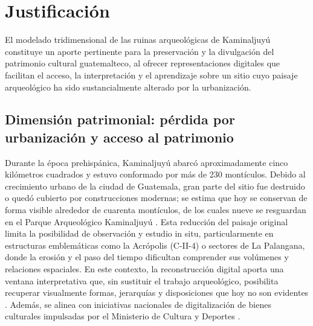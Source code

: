 
\section{Justificación}

El modelado tridimensional de las ruinas arqueológicas de Kaminaljuyú constituye un aporte pertinente para la preservación y la divulgación del patrimonio cultural guatemalteco, al ofrecer representaciones digitales que facilitan el acceso, la interpretación y el aprendizaje sobre un sitio cuyo paisaje arqueológico ha sido sustancialmente alterado por la urbanización.

\subsection*{Dimensión patrimonial: pérdida por urbanización y acceso al patrimonio}
Durante la época prehispánica, Kaminaljuyú abarcó aproximadamente cinco kilómetros cuadrados y estuvo conformado por más de 230 montículos. Debido al crecimiento urbano de la ciudad de Guatemala, gran parte del sitio fue destruido o quedó cubierto por construcciones modernas; se estima que hoy se conservan de forma visible alrededor de cuarenta montículos, de los cuales nueve se resguardan en el Parque Arqueológico Kaminaljuyú \cite{HemerotecaPL2016}. Esta reducción del paisaje original limita la posibilidad de observación y estudio in situ, particularmente en estructuras emblemáticas como la Acrópolis (C-II-4) o sectores de La Palangana, donde la erosión y el paso del tiempo dificultan comprender sus volúmenes y relaciones espaciales. En este contexto, la reconstrucción digital aporta una ventana interpretativa que, sin sustituir el trabajo arqueológico, posibilita recuperar visualmente formas, jerarquías y disposiciones que hoy no son evidentes \cite{FundacionWiese2017}. Además, se alinea con iniciativas nacionales de digitalización de bienes culturales impulsadas por el Ministerio de Cultura y Deportes \cite{MCD2024}.

